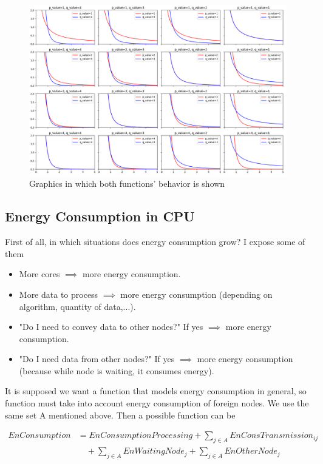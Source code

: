 \documentclass{article}
\begin{document}
\begin{figure}[h]
  \centering
  \includegraphics[width=1.3\textwidth]{graficas.png}
  \caption{Graphics in which both functions' behavior is shown}
  \label{fig:etiqueta}
\end{figure}

  \clearpage
  \subsection{Energy Consumption in CPU}
  First of all, in which situations does energy consumption grow? I expose some of them 
  
	\begin{itemize}
       \item More cores \(\implies\) more energy consumption. 
       \item More data to process \(\implies\) more energy consumption (depending on algorithm, quantity of data,...).
       \item "Do I need to convey data to other nodes?" If yes \(\implies\) more energy consumption.
       \item "Do I need data from other nodes?" If yes \(\implies\) more energy consumption (because while node is waiting, it consumes energy).
	\end{itemize}
 It is supposed we want a function that models energy consumption in general, so function must take into account energy consumption of foreign nodes. We use the same set A mentioned above. Then a possible function can be
 
\begin{align*}
    EnConsumption &= EnConsumptionProcessing + \sum_{j \in A} EnConsTransmission_{ij} \\
    &\quad + \sum_{j \in A} EnWaitingNode_j + \sum_{j \in A} EnOtherNode_j
\end{align*}
\end{document}
